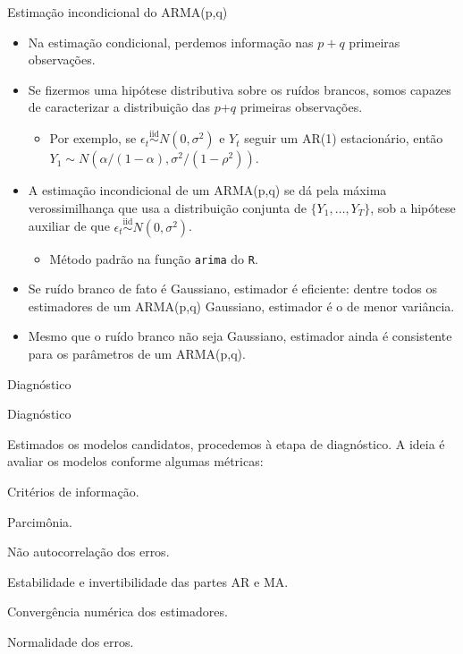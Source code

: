 \documentclass[11pt]{beamer}
\newenvironment{transitionframe}{
	\setbeamercolor{background canvas}{bg=yellow}
	\begin{frame}}{
	\end{frame}
}
\newenvironment{halfwideitemize}{\itemize\addtolength{\itemsep}{0.5em}}{\enditemize}
\newenvironment{halfwideenumerate}{\enumerate\addtolength{\itemsep}{0.5em}}{\endenumerate}
\begin{document}
\begin{frame}{Estimação incondicional do ARMA(p,q)}
	\begin{itemize}
		\item Na estimação condicional, perdemos informação nas $p+q$ primeiras observações.
		\item Se fizermos uma hipótese distributiva sobre os ruídos brancos, somos capazes de caracterizar a distribuição das $p$+$q$ primeiras observações.
		\begin{itemize}
			\item Por exemplo, se $\epsilon_t \overset{\text{iid}}{\sim} N(0,\sigma^2)$ e $Y_t$ seguir um AR(1) estacionário, então $Y_1 \sim N(\alpha/(1-\alpha), \sigma^2/(1-\rho^2))$.
		\end{itemize}
		\item A estimação {\color{blue}incondicional} de um ARMA(p,q) se dá pela máxima verossimilhança que usa a distribuição conjunta de $\{Y_1,\ldots, Y_T\}$, sob a hipótese auxiliar de que  $\epsilon_t \overset{\text{iid}}{\sim} N(0,\sigma^2)$.
		\begin{itemize}
			\item Método padrão na função \texttt{arima} do \texttt{R}.
		\end{itemize}
		\item Se ruído branco de fato é Gaussiano, estimador é {\color{blue}eficiente}: dentre todos os estimadores de um ARMA(p,q) Gaussiano, estimador é o de menor variância.
		\item Mesmo que o ruído branco não seja Gaussiano, estimador ainda é {\color{blue}consistente} para os parâmetros de um ARMA(p,q).
 	\end{itemize}
\end{frame}

\begin{transitionframe}
	\begin{center}
		{\Huge   Diagnóstico}
	\end{center}
\end{transitionframe}


\begin{frame}{Diagnóstico}
	\begin{halfwideitemize}
		\item Estimados os modelos candidatos, procedemos à etapa de diagnóstico. A ideia é avaliar os modelos conforme algumas métricas:
		\begin{halfwideenumerate}
			\item Critérios de informação.
			\item Parcimônia. 
			\item Não autocorrelação dos erros.
			\item Estabilidade e invertibilidade das partes AR e MA.
			\item Convergência numérica dos estimadores.
			\item Normalidade dos erros.
		\end{halfwideenumerate}
	\end{halfwideitemize}
\end{frame}
\end{document}
